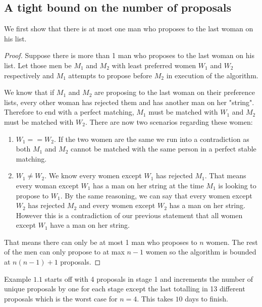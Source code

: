 \documentclass{article}
\begin{document}
\subsection{A tight bound on the number of proposals}
We first show that there is at most one man who proposes to the last woman on his list.
\begin{proof}
    Suppose there is more than 1 man who proposes to the last woman on his list. Let those men be \(M_1\) and \(M_2\) 
    with least preferred women \(W_1\) and \(W_2\) respectively and \(M_1\) attempts to propose before \(M_2\) in execution of the algorithm.

    We know that if \(M_1\) and \(M_2\) are proposing to the last woman on their preference lists, every other woman
    has rejected them and has another man on her "string". Therefore to end with a perfect matching, \(M_1\) must be matched
    with \(W_1\) and \(M_2\) must be matched with \(W_2\). There are now two scenarios regarding these women:

    \begin{enumerate}
        \item \(W_1 == W_2\). If the two women are the same we run into a contradiction as both \(M_1\) and \(M_2\) cannot be matched with the same person in a perfect stable matching. 
        \item \(W_1 \neq W_2\). We know every women except \(W_1\) has rejected \(M_1\). That means every woman except \(W_1\) has a man on her string at the time \(M_1\) is looking to propose 
                to \(W_1\). By the same reasoning, we can say that every women except \(W_2\) has rejected \(M_2\) and every women except \(W_2\) has a man on her string.
                However this is a contradiction of our previous statement that all women except \(W_1\) have a man on her string.
    \end{enumerate}

    That means there can only be at most 1 man who proposes to \(n\) women. The rest of the men can only propose to at max \(n-1\) women so 
    the algorithm is bounded at \(n(n-1) + 1\) proposals.
\end{proof}

Example \(1.1\) starts off with 4 proposals in stage 1 and increments the number of unique proposals by one for each stage except the last totalling in
13 different proposals which is the worst case for \(n=4\). This takes \(10\) days to finish. 

\newpage
\end{document}
